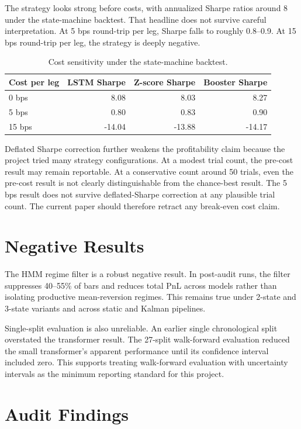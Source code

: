 \documentclass[11pt]{article}
\begin{document}
The strategy looks strong before costs, with annualized Sharpe ratios around
8 under the state-machine backtest. That headline does not survive careful
interpretation. At 5 bps round-trip per leg, Sharpe falls to roughly 0.8--0.9.
At 15 bps round-trip per leg, the strategy is deeply negative.

\begin{table}[h]
\centering
\caption{Cost sensitivity under the state-machine backtest.}
\begin{tabular}{lrrr}
\toprule
Cost per leg & LSTM Sharpe & Z-score Sharpe & Booster Sharpe \\
\midrule
0 bps & 8.08 & 8.03 & 8.27 \\
5 bps & 0.80 & 0.83 & 0.90 \\
15 bps & -14.04 & -13.88 & -14.17 \\
\bottomrule
\end{tabular}
\end{table}

Deflated Sharpe correction further weakens the profitability claim because the
project tried many strategy configurations. At a modest trial count, the
pre-cost result may remain reportable. At a conservative count around 50
trials, even the pre-cost result is not clearly distinguishable from the
chance-best result. The 5 bps result does not survive deflated-Sharpe
correction at any plausible trial count. The current paper should therefore
retract any break-even cost claim.

\section{Negative Results}

The HMM regime filter is a robust negative result. In post-audit runs, the
filter suppresses 40--55\% of bars and reduces total PnL across models rather
than isolating productive mean-reversion regimes. This remains true under
2-state and 3-state variants and across static and Kalman pipelines.

Single-split evaluation is also unreliable. An earlier single chronological
split overstated the transformer result. The 27-split walk-forward evaluation
reduced the small transformer's apparent performance until its confidence
interval included zero. This supports treating walk-forward evaluation with
uncertainty intervals as the minimum reporting standard for this project.

\section{Audit Findings}
\end{document}
